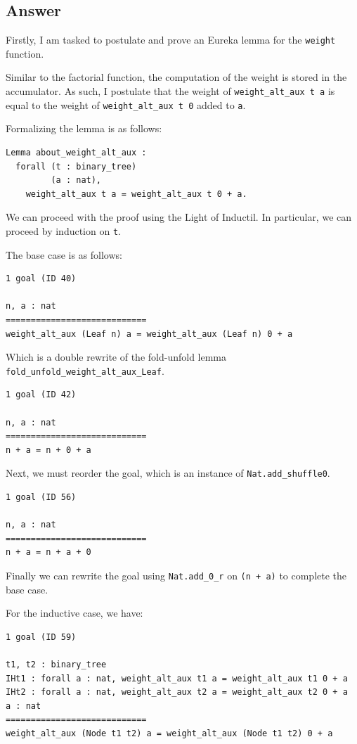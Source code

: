 \documentclass{article}
\begin{document}
\subsection{Answer}

Firstly, I am tasked to postulate and prove an Eureka lemma for the \texttt{weight} function.

Similar to the factorial function, the computation of the weight is stored in the accumulator. As such, I postulate that the weight of \texttt{weight\_alt\_aux t a} is equal to the weight of \texttt{weight\_alt\_aux t 0} added to \texttt{a}.

Formalizing the lemma is as follows:

\begin{lstlisting}
Lemma about_weight_alt_aux :
  forall (t : binary_tree)
         (a : nat),
    weight_alt_aux t a = weight_alt_aux t 0 + a.
\end{lstlisting}

We can proceed with the proof using the Light of Inductil. In particular, we can proceed by induction on \texttt{t}.

The base case is as follows:

\begin{lstlisting}
1 goal (ID 40)

n, a : nat
============================
weight_alt_aux (Leaf n) a = weight_alt_aux (Leaf n) 0 + a
\end{lstlisting}

Which is a double rewrite of the fold-unfold lemma \texttt{fold\_unfold\_weight\_alt\_aux\_Leaf}.

\begin{lstlisting}
1 goal (ID 42)

n, a : nat
============================
n + a = n + 0 + a
\end{lstlisting}

Next, we must reorder the goal, which is an instance of \texttt{Nat.add\_shuffle0}.

\begin{lstlisting}
1 goal (ID 56)

n, a : nat
============================
n + a = n + a + 0
\end{lstlisting}

Finally we can rewrite the goal using \texttt{Nat.add\_0\_r} on \texttt{(n + a)} to complete the base case.

For the inductive case, we have:

\begin{lstlisting}
1 goal (ID 59)

t1, t2 : binary_tree
IHt1 : forall a : nat, weight_alt_aux t1 a = weight_alt_aux t1 0 + a
IHt2 : forall a : nat, weight_alt_aux t2 a = weight_alt_aux t2 0 + a
a : nat
============================
weight_alt_aux (Node t1 t2) a = weight_alt_aux (Node t1 t2) 0 + a
\end{lstlisting}
\end{document}
